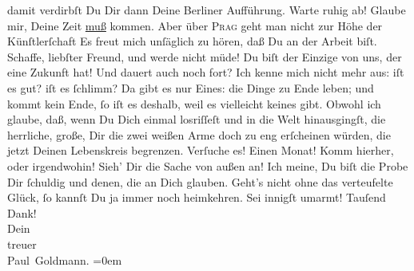 \begin{ledgroupsized}[t]{13cm}
               damit verdirbſt Du Dir dann Deine Berliner
               Aufführung. Warte ruhig ab! Glaube mir, Deine Zeit \uline{muß} kommen. Aber über \textsc{Prag} geht man nicht zur Höhe der Künſtlerſchaft{\dotsfour}\pend
           \pstart
           Es freut mich unſäglich zu hören, daß Du an der Arbeit biſt. Schaffe, liebſter
               Freund, und werde nicht {\pb}müde! Du biſt der Einzige von
               uns, der eine Zukunft hat!\pend
           \pstart
           Und \label{K_L02699-5v}\label{K_L02699-5h} dauert auch noch
               fort? Ich kenne mich nicht mehr aus: iſt es gut? iſt es ſchlimm? Da gibt es nur
               Eines: die Dinge zu Ende leben; und  kommt kein
               Ende, ſo iſt es deshalb, weil es vielleicht keines gibt. Obwohl ich glaube, daß, wenn
               Du Dich einmal losriſſeſt und in die Welt hinausgingſt, die herrliche, große, Dir die
               zwei weißen Arme doch zu eng
               erſcheinen würden, die jetzt Deinen {\pb}Lebenskreis
               begrenzen. Verſuche es! Einen Monat! Komm hierher, oder irgendwohin! Sieh’ Dir die
                  Sache von außen an! Ich
               meine, Du biſt die Probe Dir ſchuldig und denen, die an Dich glauben. Geht’s
                  nicht\strikeout{,} ohne das verteufelte Glück, ſo kannſt Du ja immer noch
               heimkehren.\pend
           \pstart
           Sei innigſt umarmt! Tauſend Dank! {\\[\baselineskip]}Dein{\\[\baselineskip]}treuer{\\[\baselineskip]}\spacefill\mbox{Paul Goldmann.}\pend
           \leftskip=0em{}
         
         \endnumbering{}\end{ledgroupsized}  \newcommand{\dateiname}{L02699}\newcommand{\titel}{Paul Goldmann an Arthur Schnitzler, 27. 6. [1892]}\newcommand{\editorInnen}{Martin Anton Müller und Laura Untner}
      